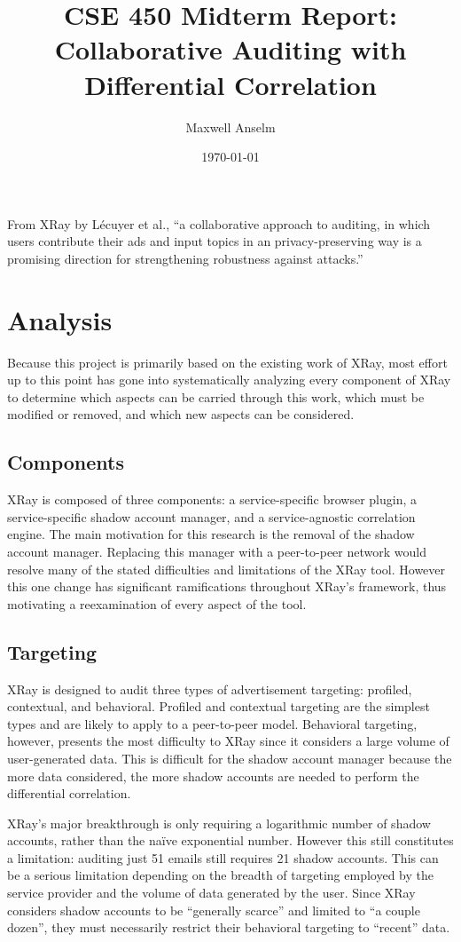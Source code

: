 \documentclass{article}
\title{CSE 450 Midterm Report:\\
Collaborative Auditing with Differential Correlation}
\author{Maxwell Anselm}
\date{\today}
\begin{document}
\maketitle

From XRay by L\'ecuyer et al., ``a collaborative approach to auditing, in which
users contribute their ads and input topics in an privacy-preserving way is a
promising direction for strengthening robustness against attacks.''

\section{Analysis}

Because this project is primarily based on the existing work of XRay, most
effort up to this point has gone into systematically analyzing every component
of XRay to determine which aspects can be carried through this work, which
must be modified or removed, and which new aspects can be considered.

\subsection{Components}

XRay is composed of three components: a service-specific browser plugin, a
service-specific shadow account manager, and a service-agnostic correlation
engine. The main motivation for this research is the removal of the shadow
account manager. Replacing this manager with a peer-to-peer network would
resolve many of the stated difficulties and limitations of the XRay tool.
However this one change has significant ramifications throughout XRay's
framework, thus motivating a reexamination of every aspect of the tool.

\subsection{Targeting}

XRay is designed to audit three types of advertisement targeting: profiled,
contextual, and behavioral. Profiled and contextual targeting are the simplest
types and are likely to apply to a peer-to-peer model. Behavioral targeting,
however, presents the most difficulty to XRay since it considers a large volume
of user-generated data. This is difficult for the shadow account manager
because the more data considered, the more shadow accounts are needed to
perform the differential correlation.

XRay's major breakthrough is only requiring a logarithmic number of shadow
accounts, rather than the na\"ive exponential number. However this still
constitutes a limitation: auditing just 51 emails still requires 21 shadow
accounts. This can be a serious limitation depending on the breadth of targeting
employed by the service provider and the volume of data generated by the user.
Since XRay considers shadow accounts to be ``generally scarce'' and limited to
``a couple dozen'', they must necessarily restrict their behavioral targeting to
``recent'' data.
\end{document}
